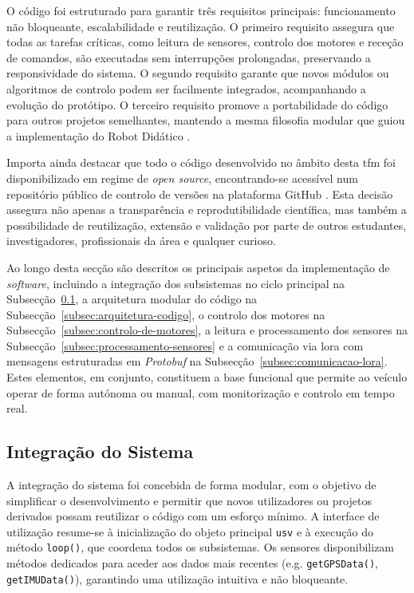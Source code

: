 O código foi estruturado para garantir três requisitos principais: funcionamento não bloqueante, escalabilidade e reutilização. O primeiro requisito assegura que todas as tarefas críticas, como leitura de sensores, controlo dos motores e receção de comandos, são executadas sem interrupções prolongadas, preservando a responsividade do sistema. O segundo requisito garante que novos módulos ou algoritmos de controlo podem ser facilmente integrados, acompanhando a evolução do protótipo. O terceiro requisito promove a portabilidade do código para outros projetos semelhantes, mantendo a mesma filosofia modular que guiou a implementação do Robot Didático \cite{didactic-robot-thesis}.  

Importa ainda destacar que todo o código desenvolvido no âmbito desta \gls{tfm} foi disponibilizado em regime de \emph{open source}, encontrando-se acessível num repositório público de controlo de versões na plataforma GitHub \cite{github-usv}. Esta decisão assegura não apenas a transparência e reprodutibilidade científica, mas também a possibilidade de reutilização, extensão e validação por parte de outros estudantes, investigadores, profissionais da área e qualquer curioso.

Ao longo desta secção são descritos os principais aspetos da implementação de \emph{software}, incluindo a integração dos subsistemas no ciclo principal na Subsecção~\ref{sec:integracao}, a arquitetura modular do código na Subsecção~\ref{subsec:arquitetura-codigo}, o controlo dos motores na Subsecção~\ref{subsec:controlo-de-motores}, a leitura e processamento dos sensores na Subsecção~\ref{subsec:processamento-sensores} e a comunicação via \gls{lora} com mensagens estruturadas em \emph{Protobuf} na Subsecção~\ref{subsec:comunicacao-lora}. Estes elementos, em conjunto, constituem a base funcional que permite ao veículo operar de forma autónoma ou manual, com monitorização e controlo em tempo real.

\subsection{Integração do Sistema}
\label{sec:integracao}

A integração do sistema foi concebida de forma modular, com o objetivo de simplificar o desenvolvimento e permitir que novos utilizadores ou projetos derivados possam reutilizar o código com um esforço mínimo. A interface de utilização resume-se à inicialização do objeto principal \texttt{\gls{usv}} e à execução do método \texttt{loop()}, que coordena todos os subsistemas. Os sensores disponibilizam métodos dedicados para aceder aos dados mais recentes (e.g. \texttt{getGPSData()}, \texttt{getIMUData()}), garantindo uma utilização intuitiva e não bloqueante.  

